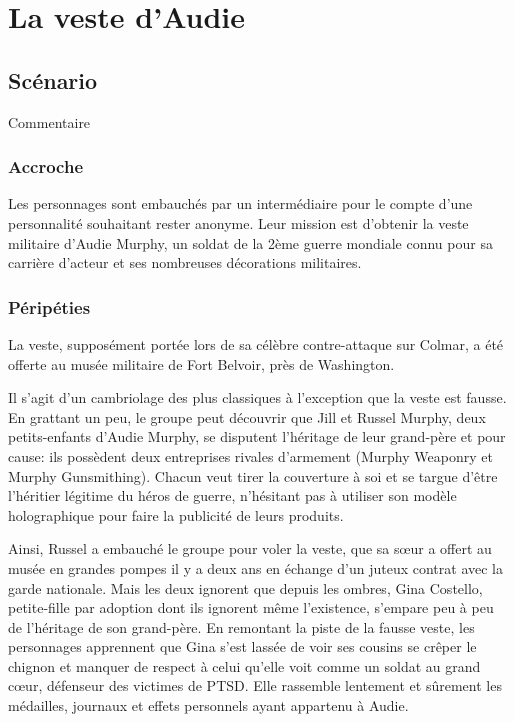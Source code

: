 \chapter{La veste d'Audie}

\section{Scénario}

Commentaire

\subsection{Accroche}

Les personnages sont embauchés par un intermédiaire pour le compte d'une personnalité souhaitant rester anonyme. Leur mission est d'obtenir la veste militaire d'Audie Murphy, un soldat de la 2ème guerre mondiale connu pour sa carrière d'acteur et ses nombreuses décorations militaires.

\subsection{Péripéties}

 La veste, supposément portée lors de sa célèbre contre-attaque sur Colmar, a été offerte au musée militaire de Fort Belvoir, près de Washington.

Il s'agit d'un cambriolage des plus classiques à l'exception que la veste est fausse. En grattant un peu, le groupe peut découvrir que Jill et Russel Murphy, deux petits-enfants d'Audie Murphy, se disputent l'héritage de leur grand-père et pour cause: ils possèdent deux entreprises rivales d'armement (Murphy Weaponry et Murphy Gunsmithing). Chacun veut tirer la couverture à soi et se targue d'être l'héritier légitime du héros de guerre, n'hésitant pas à utiliser son modèle holographique pour faire la publicité de leurs produits.

Ainsi, Russel a embauché le groupe pour voler la veste, que sa sœur a offert au musée en grandes pompes il y a deux ans en échange d'un juteux contrat avec la garde nationale. Mais les deux ignorent que depuis les ombres, Gina Costello, petite-fille par adoption dont ils ignorent même l'existence, s'empare peu à peu de l'héritage de son grand-père. En remontant la piste de la fausse veste, les personnages apprennent que Gina s'est lassée de voir ses cousins se crêper le chignon et manquer de respect à celui qu'elle voit comme un soldat au grand cœur, défenseur des victimes de PTSD. Elle rassemble lentement et sûrement les médailles, journaux et effets personnels ayant appartenu à Audie.

